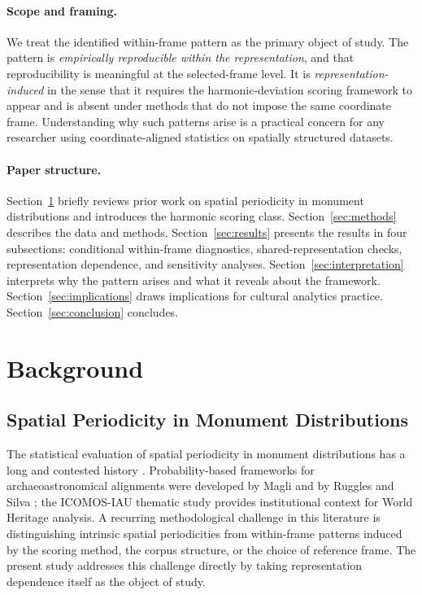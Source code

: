 \documentclass[12pt,a4paper]{article}
\begin{document}
\paragraph{Scope and framing.}
We treat the identified within-frame pattern as the primary object of study.
The pattern is \emph{empirically reproducible within the representation}, and
that reproducibility is meaningful at the selected-frame level. It is
\emph{representation-induced} in the sense that it requires the
harmonic-deviation scoring framework to appear and is absent under methods
that do not impose the same coordinate frame. Understanding why such patterns
arise is a practical concern for any researcher using coordinate-aligned
statistics on spatially structured datasets.

\paragraph{Paper structure.}
Section~\ref{sec:background} briefly reviews prior work on spatial periodicity
in monument distributions and introduces the harmonic scoring class.
Section~\ref{sec:methods} describes the data and methods.
Section~\ref{sec:results} presents the results in four subsections: conditional
within-frame diagnostics, shared-representation checks, representation
dependence, and sensitivity analyses. Section~\ref{sec:interpretation}
interprets why the pattern
arises and what it reveals about the framework. Section~\ref{sec:implications}
draws implications for cultural analytics practice.
Section~\ref{sec:conclusion} concludes.

\section{Background}
\label{sec:background}

\subsection{Spatial Periodicity in Monument Distributions}

The statistical evaluation of spatial periodicity in monument distributions has
a long and contested history \citep{thom1967,kendall1974,freeman1976}.
Probability-based frameworks for archaeoastronomical alignments were developed
by Magli \citep{magli2013,magli2016} and by Ruggles and Silva
\citep{ruggles1999astronomy,ruggles2015handbook,silva2020statistical};
the ICOMOS-IAU thematic study \citep{ruggles2010icomos} provides institutional
context for World Heritage analysis. A recurring methodological challenge in
this literature is distinguishing intrinsic spatial periodicities from
within-frame patterns induced by the scoring method, the corpus structure, or
the choice of reference frame. The present study addresses this challenge
directly by taking representation dependence itself as the object of study.
\end{document}
